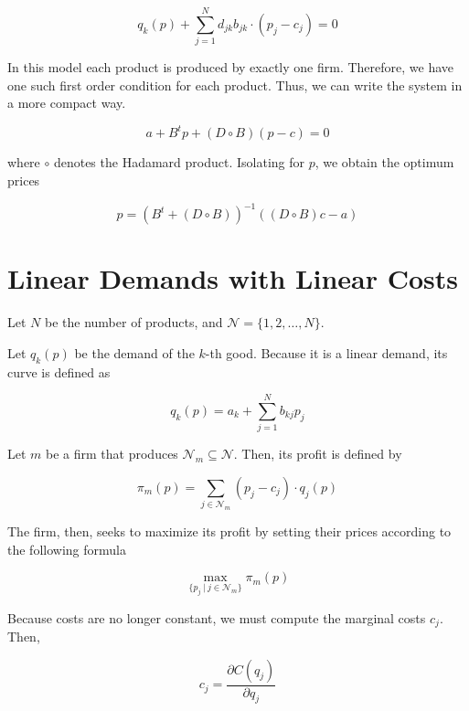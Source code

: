 \documentclass[12pt]{article}
\begin{document}
\begin{equation*}
q_k(p) + \sum_{j = 1}^N d_{jk}b_{jk} \cdot (p_j - c_j) = 0
\end{equation*}

In this model each product is produced by exactly one firm. Therefore, we have one such first order condition for each product. Thus, we can write the system in a more compact way. 

\begin{equation*}
a + B^t p + (D \circ B)(p - c) = 0
\end{equation*}

where $\circ$ denotes the Hadamard product.
Isolating for $p$, we obtain the optimum prices

\begin{equation*}
p = (B^t + (D \circ B))^{-1}((D \circ B) c - a)
\end{equation*}


\section{Linear Demands with Linear Costs}

Let $N$ be the number of products, and $\mathcal{N} = \{1, 2, \dots, N\}$.

Let $q_k (p)$ be the demand of the $k$-th good. Because it is a linear demand, its curve is defined as

\begin{equation*}
q_k(p) = a_k + \sum_{j=1}^N b_{kj}p_j
\end{equation*}

Let $m$ be a firm that produces $\mathcal{N}_m \subseteq \mathcal{N}$. Then, its profit is defined by

\begin{equation*}
\pi_m(p) = \sum_{j \in \mathcal{N}_m} (p_j - c_j)\cdot q_j(p)
\end{equation*}

The firm, then, seeks to maximize its profit by setting their prices according to the following formula

\begin{equation*}
\max_{\{p_j ~ | ~ j \in \mathcal{N}_m\}} \pi_m(p)
\end{equation*}

Because costs are no longer constant, we must compute the marginal costs $c_j$. Then,

\begin{equation*}
c_j = \frac{\partial C(q_j)}{\partial q_j}
\end{equation*}
\end{document}
